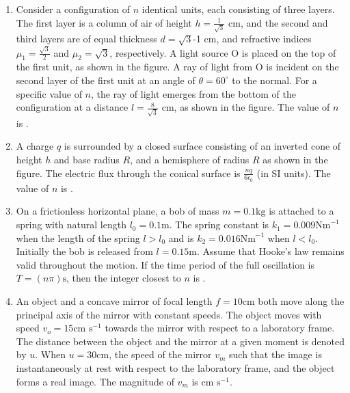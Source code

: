 \documentclass{article}
\begin{document}
\begin{enumerate}
    \item Consider a configuration of \( n \) identical units, each consisting of three layers. The first layer is a column of air of height \( h = \frac{1}{\sqrt{3}} \) cm, and the second and third layers are of equal thickness \( d = \sqrt{3} \)-1 cm, and refractive indices \( \mu_1 = \frac{\sqrt{3}}{2} \) and \( \mu_2 = \sqrt{3} \), respectively. A light source O is placed on the top of the first unit, as shown in the figure. A ray of light from O is incident on the second layer of the first unit at an angle of \( \theta = 60^\circ \) to the normal. For a specific value of \( n \), the ray of light emerges from the bottom of the configuration at a distance \( l = \frac{8}{\sqrt{3}} \) cm, as shown in the figure. The value of \( n \) is \underline{\quad} .
    \begin{center}
        \end{center}
    \item A charge \( q \) is surrounded by a closed surface consisting of an inverted cone of height \( h \) and base radius \( R \), and a hemisphere of radius \( R \) as shown in the figure. The electric flux through the conical surface is \( \frac{nq}{6\epsilon_0} \) (in SI units). The value of \( n \) is \underline{\quad} .
    \begin{center}
    \end{center}

    \item On a frictionless horizontal plane, a bob of mass \( m = 0.1 \text{kg} \) is attached to a spring with natural length \( l_0 = 0.1 \text{m} \). The spring constant is \( k_1 = 0.009 \text{Nm}^{-1} \) when the length of the spring \( l > l_0 \) and is \( k_2 = 0.016 \text{Nm}^{-1} \) when \( l < l_0 \). Initially the bob is released from \( l = 0.15 \text{m} \). Assume that Hooke's law remains valid throughout the motion. If the time period of the full oscillation is \( T = (n \pi) \text{s} \), then the integer closest to \( n \) is \underline{\hspace{1cm}}.

    \item An object and a concave mirror of focal length \( f = 10 \text{cm} \) both move along the principal axis of the mirror with constant speeds. The object moves with speed \( v_o = 15 \text{cm s}^{-1} \) towards the mirror with respect to a laboratory frame. The distance between the object and the mirror at a given moment is denoted by \( u \). When \( u = 30 \text{cm} \), the speed of the mirror \( v_m \) such that the image is instantaneously at rest with respect to the laboratory frame, and the object forms a real image. The magnitude of \( v_m \) is \underline{\hspace{1cm}} \( \text{cm s}^{-1} \).


\end{enumerate}
\end{document}
